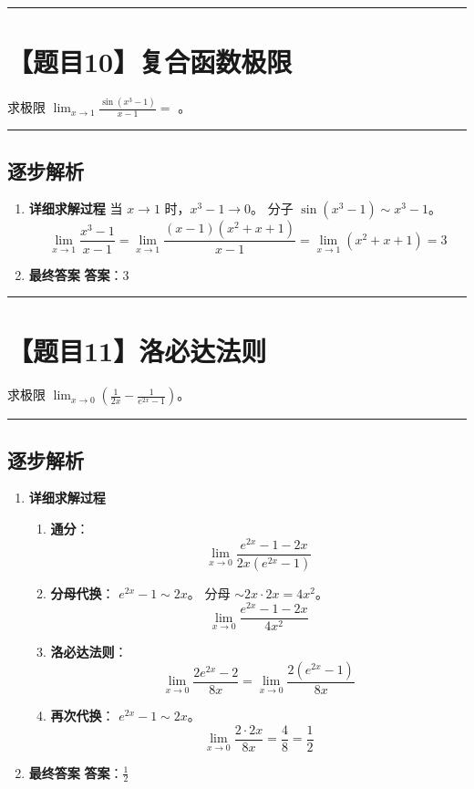 \documentclass[UTF8]{ctexart}
\newenvironment{redenv}{\color{red}}{}
\newenvironment{detailedanalysis}{%
    \color{red}
    \begin{enumerate}[label=\textbf{第\arabic*步：}, leftmargin=*, align=left, itemsep=1.5ex]
}{%
    \end{enumerate}
}
\newcommand{\problemrule}{\noindent\rule{\textwidth}{1.5pt}\vspace{-0.8em}}
\newcommand{\analysisrule}{\noindent\rule{\textwidth}{0.8pt}\vspace{-0.8em}}
\newcommand{\blank}[1]{\underline{\hspace{#1}}}
\begin{document}
\problemrule
\section*{【题目10】复合函数极限}
求极限 $ \lim_{x\to1}\frac{\sin(x^{3}-1)}{x-1}= $ \blank{2cm}。

\begin{redenv}
\analysisrule
\subsection*{逐步解析}

\begin{detailedanalysis}
\item \textbf{详细求解过程}
当 $x \to 1$ 时，$x^3 - 1 \to 0$。
分子 $\sin(x^3 - 1) \sim x^3 - 1$。
$$ \lim_{x\to1} \frac{x^3 - 1}{x - 1} = \lim_{x\to1} \frac{(x-1)(x^2 + x + 1)}{x - 1} = \lim_{x\to1} (x^2 + x + 1) = 3 $$

\item \textbf{最终答案}
\textbf{答案}：3
\end{detailedanalysis}
\end{redenv}

\problemrule
\section*{【题目11】洛必达法则}
求极限 $ \lim_{x\to0}\left(\frac{1}{2x}-\frac{1}{e^{2x}-1}\right) $。

\begin{redenv}
\analysisrule
\subsection*{逐步解析}

\begin{detailedanalysis}
\item \textbf{详细求解过程}
\begin{enumerate}[label=(\arabic*)]
\item \textbf{通分}：
$$ \lim_{x \to 0} \frac{e^{2x} - 1 - 2x}{2x(e^{2x} - 1)} $$
\item \textbf{分母代换}：
$e^{2x} - 1 \sim 2x$。
分母 $\sim 2x \cdot 2x = 4x^2$。
$$ \lim_{x \to 0} \frac{e^{2x} - 1 - 2x}{4x^2} $$
\item \textbf{洛必达法则}：
$$ \lim_{x \to 0} \frac{2e^{2x} - 2}{8x} = \lim_{x \to 0} \frac{2(e^{2x} - 1)}{8x} $$
\item \textbf{再次代换}：
$e^{2x} - 1 \sim 2x$。
$$ \lim_{x \to 0} \frac{2 \cdot 2x}{8x} = \frac{4}{8} = \frac{1}{2} $$
\end{enumerate}

\item \textbf{最终答案}
\textbf{答案}：$ \frac{1}{2} $
\end{detailedanalysis}
\end{redenv}
\end{document}
